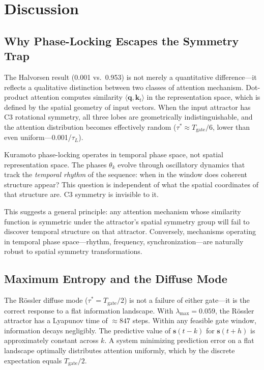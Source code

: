 \documentclass[12pt]{article}
\theoremstyle{definition}
\begin{document}
\section{Discussion}
\label{sec:discussion}

\subsection{Why Phase-Locking Escapes the Symmetry Trap}

The Halvorsen result (0.001 vs.\ 0.953) is not merely a quantitative difference---it
reflects a qualitative distinction between two classes of attention mechanism. Dot-product
attention computes similarity $\langle \mathbf{q}, \mathbf{k}_t \rangle$ in the
representation space, which is defined by the spatial geometry of input vectors. When the
input attractor has C3 rotational symmetry, all three lobes are geometrically
indistinguishable, and the attention distribution becomes effectively random
($\tau^* \approx T_{\text{gate}}/6$, lower than even uniform---0.001/$\tau_L$).

Kuramoto phase-locking operates in temporal phase space, not spatial representation
space. The phases $\theta_k$ evolve through oscillatory dynamics that track the
\emph{temporal rhythm} of the sequence: when in the window does coherent structure
appear? This question is independent of what the spatial coordinates of that structure
are. C3 symmetry is invisible to it.

This suggests a general principle: any attention mechanism whose similarity function
is symmetric under the attractor's spatial symmetry group will fail to discover
temporal structure on that attractor. Conversely, mechanisms operating in temporal
phase space---rhythm, frequency, synchronization---are naturally robust to spatial
symmetry transformations.

\subsection{Maximum Entropy and the Diffuse Mode}

The R\"{o}ssler diffuse mode ($\tau^* = T_{\text{gate}}/2$) is not a failure of either
gate---it is the correct response to a flat information landscape. With
$\lambda_{\max} = 0.059$, the R\"{o}ssler attractor has a Lyapunov time of $\approx 847$
steps. Within any feasible gate window, information decays negligibly. The predictive
value of $\mathbf{s}(t-k)$ for $\mathbf{s}(t+h)$ is approximately constant across $k$.
A system minimizing prediction error on a flat landscape optimally distributes attention
uniformly, which by the discrete expectation equals $T_{\text{gate}}/2$.
\end{document}
